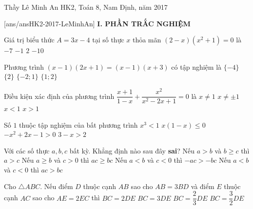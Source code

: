 \begin{name}
{Thầy  Lê Minh An}
{HK2, Toán 8, Nam Định, năm 2017}
\end{name}
[ans/ansHK2-2017-LeMinhAn]
\noindent\textbf{I. PHẦN TRẮC NGHIỆM}
\setcounter{ex}{0}
\begin{ex}%
Giá trị biểu thức $A=3x-4$ tại số thực $x$ thỏa mãn $(2-x)(x^2+1)=0$ là
\choice
{$-7$}
{$-1$}
{\True $2$}
{$-10$}
\end{ex}

\begin{ex}%
Phương trình $(x-1)(2x+1)=(x-1)(x+3)$ có tập nghiệm là 
\choice
{$\{-4\}$}
{$\{2\}$}
{$\{-2;1\}$}
{\True $\{1;2\}$}
\end{ex}

\begin{ex}%
Điều kiện xác định của phương trình $\dfrac{x+1}{1-x}+\dfrac{x^2}{x^2-2x+1}=0$ là
\choice
{\True $x\neq 1$}
{$x\neq \pm 1$}
{$x<1$}
{$x>1$}
\end{ex}

\begin{ex}%
Số $1$ thuộc tập nghiệm của bất phương trình
\choice
{$x^3<1$}
{\True $x(1-x)\le 0$}
{$-x^2+2x-1>0$}
{$3-x>2$}
\end{ex}

\begin{ex}%
Với các số thực $a,b,c$ bất kỳ. Khẳng định nào sau đây \textbf{sai}?
\choice
{Nếu $a>b$ và $b\ge c$ thì $a>c$}
{Nếu $a\ge b$ và $c>0$ thì $ac\ge bc$}
{\True Nếu $a<b$ và $c<0$ thì $-ac>-bc$}
{Nếu $a<b$ và $c<0$ thì $ac>bc$}
\end{ex}

\begin{ex}%
Cho $\triangle ABC$. Nếu điểm $D$ thuộc cạnh $AB$ sao cho $AB=3BD$ và điểm $E$ thuộc cạnh $AC$ sao cho $AE=2EC$ thì
\choice
{$BC=2DE$}
{$BC=3DE$}
{$BC=\dfrac{2}{3}DE$}
{\True $BC=\dfrac{3}{2}DE$}
\end{ex}

